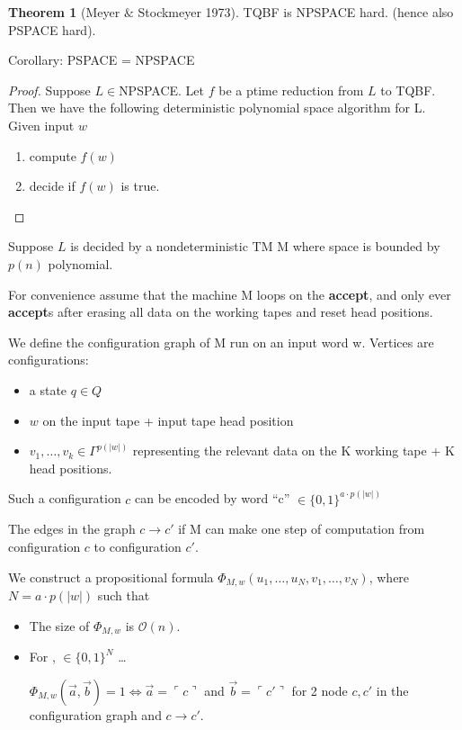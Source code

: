 \documentclass[a4paper,12pt]{article}
\theoremstyle{definition}
\newtheorem{theorem}[counter]{Theorem}
\theoremstyle{remark}
\begin{document}
\begin{theorem}[Meyer $\&$ Stockmeyer 1973]
    TQBF is NPSPACE hard. (hence also PSPACE hard).
\end{theorem}
Corollary: PSPACE = NPSPACE
\begin{proof}
    Suppose $L \in $NPSPACE. Let $f$ be a ptime reduction from $L$ to TQBF. Then we have the following deterministic polynomial space algorithm
    for L. Given input $w$
    \begin{enumerate}
        \item compute $f(w)$
        \item decide if $f(w)$ is true.
    \end{enumerate}
\end{proof}

Suppose $L$ is decided by a nondeterministic TM M where space is bounded by $p(n)$ polynomial.

For convenience assume that the machine M loops on the \textbf{accept}, and only ever \textbf{accept}s after erasing all data on the working tapes
 and reset head positions.

We define the configuration graph of M run on an input word w. Vertices are configurations:
\begin{itemize}
    \item a state $q \in Q$
    \item $w$ on the input tape + input tape head position
    \item $v_1, \dots, v_k \in \Gamma^{p(|w|)}$ representing the relevant data on the K working tape + K head positions. 
\end{itemize}

Such a configuration $c$ can be encoded by word ``c'' $\in \{0, 1\}^{a \cdot p(|w|)}$

The edges in the graph $c \to c'$ if M can make one step of computation from configuration $c$ to configuration $c'$.

We construct a propositional formula $\Phi_{M, w}(u_1, \dots, u_N, v_1, \dots, v_N)$, where $N = a \cdot p(|w|)$ such that
\begin{itemize}
    \item The size of $\Phi_{M, w}$ is $\mathscr{O}(n)$.
    \item For ,  $\in \{0, 1\}^N$ \dots
    
    $\Phi_{M, w}(\overrightarrow{a}, \overrightarrow{b}) = 1 \iff \overrightarrow{a} = \ulcorner c \urcorner$ and $\overrightarrow{b} = \ulcorner c' \urcorner$ for 2 node $c, c'$ in the configuration graph and $c \to c'$.
\end{itemize}
\end{document}
